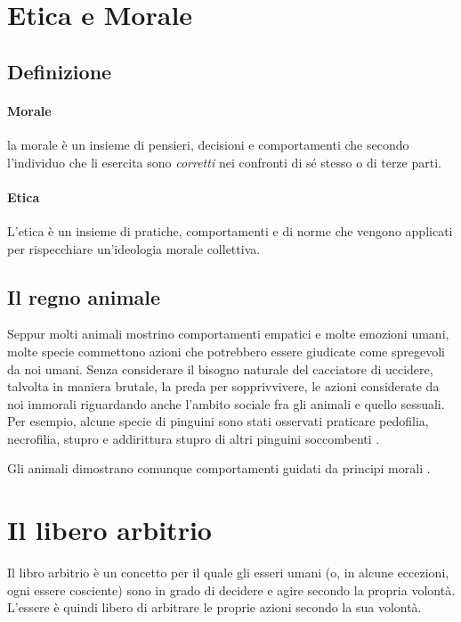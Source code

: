 \documentclass[a4paper, 12pt]{article}
\begin{document}
\pagebreak

\section{Etica e Morale}

\subsection{Definizione}

\paragraph{Morale}
la morale è un insieme di pensieri, decisioni e comportamenti che secondo l'individuo
che li esercita sono \textit{corretti} nei confronti di sé stesso o di terze parti.

\paragraph{Etica}
L'etica è un insieme di pratiche, comportamenti e di norme che vengono applicati
per rispecchiare un'ideologia morale collettiva.

\subsection{Il regno animale}

Seppur molti animali mostrino comportamenti empatici e molte emozioni umani,
molte specie commettono azioni che potrebbero essere giudicate come spregevoli da noi umani.
Senza considerare il bisogno naturale del cacciatore di uccidere, talvolta in maniera brutale,
la preda per sopprivvivere, le azioni considerate da noi immorali riguardando
anche l'ambito sociale fra gli animali e quello sessuali.
Per esempio, alcune specie di pinguini sono stati osservati praticare
pedofilia, necrofilia, stupro e addirittura stupro di altri pinguini soccombenti
\cite{penguins}.

Gli animali dimostrano comunque comportamenti guidati da principi morali
\cite{rowlands2012oxford} \cite{rowlands2015can} \cite{andrews2018routledge}.

\section{Il libero arbitrio}

Il libro arbitrio è un concetto per il quale gli esseri umani
(o, in alcune eccezioni, ogni essere cosciente) sono in grado di decidere e agire secondo la propria volontà.
L'essere è quindi libero di arbitrare le proprie azioni secondo la sua volontà.
\end{document}
